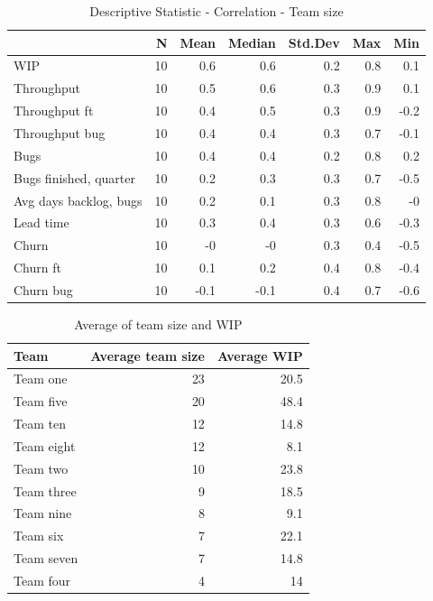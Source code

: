 \documentclass[UKenglish]{ifimaster}  %
\begin{document}
\begin{table}[!htbp]
 \centering
 \begin{tabular}{ | l | r | r | r | r | r | r | }
 \hline
& \bf{N} & \bf{Mean} & \bf{Median} & \bf{Std.Dev} & \bf{Max} & \bf{Min} \\ \hline
WIP  & 10 & 0.6 & 0.6 & 0.2 & 0.8 & 0.1\\ \hline
Throughput  & 10 & 0.5 & 0.6 & 0.3 & 0.9 & 0.1\\ \hline
Throughput ft  & 10 & 0.4 & 0.5 & 0.3 & 0.9 & -0.2\\ \hline
Throughput bug  & 10 & 0.4 & 0.4 & 0.3 & 0.7 & -0.1\\ \hline
Bugs  & 10 & 0.4 & 0.4 & 0.2 & 0.8 & 0.2\\ \hline
Bugs finished, quarter  & 10 & 0.2 & 0.3 & 0.3 & 0.7 & -0.5\\ \hline
Avg days backlog, bugs  & 10 & 0.2 & 0.1 & 0.3 & 0.8 & -0\\ \hline
Lead time & 10 & 0.3 & 0.4 & 0.3 & 0.6 & -0.3\\ \hline
Churn  & 10 & -0 & -0 & 0.3 & 0.4 & -0.5\\ \hline
Churn ft  & 10 & 0.1 & 0.2 & 0.4 & 0.8 & -0.4\\ \hline
Churn bug  & 10 & -0.1 & -0.1 & 0.4 & 0.7 & -0.6\\ \hline
\end{tabular}
 \caption{Descriptive Statistic - Correlation - Team size}
 \label{DS:corr:TS}
 \end{table}
 
 \begin{table}[!htbp]
 \centering
 \begin{tabular}{|l|r|r|}
  \hline
  \textbf{Team} & \textbf{Average team size} & \textbf{Average WIP}\\ \hline
Team one & 23 & 20.5  \\ \hline
Team five & 20 &  48.4\\ \hline
Team ten & 12 &  14.8\\ \hline
Team eight & 12 &  8.1\\ \hline
Team two & 10 & 23.8 \\ \hline
Team three & 9 &  18.5\\ \hline
Team nine  & 8 &  9.1\\ \hline
Team six & 7 &  22.1\\ \hline
Team seven & 7 & 14.8 \\ \hline
Team four & 4 &  14\\ \hline
 \end{tabular}
 \caption{Average of team size and WIP}
 \label{DS:corr:WIP:Team}
 \end{table}
\end{document}
